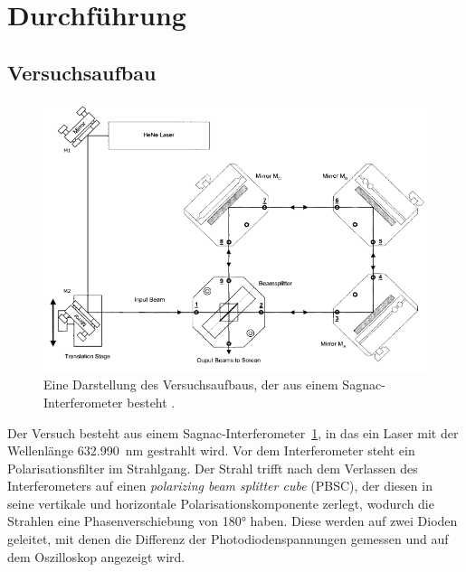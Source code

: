 \section{Durchführung}
\label{sec:Durchführung}
\subsection{Versuchsaufbau}
\begin{figure}[h]
    \centering
    \includegraphics[width = \textwidth]{bild/Aufbau.png}
    \caption{Eine Darstellung des Versuchsaufbaus, der aus einem Sagnac-Interferometer besteht \cite{V64}.}
    \label{fig:Aufbau}
\end{figure}

\noindent
Der Versuch besteht aus einem Sagnac-Interferometer~\ref{fig:Aufbau},
in das ein Laser mit der Wellenlänge \SI{632.990}{\nano\metre} gestrahlt wird. 
Vor dem Interferometer steht ein Polarisationsfilter im Strahlgang.
Der Strahl trifft nach dem Verlassen des Interferometers auf einen 
\textit{polarizing beam splitter cube} (PBSC), 
der diesen in seine vertikale und horizontale Polarisationskomponente zerlegt,
wodurch die Strahlen eine Phasenverschiebung von 180° haben.
Diese werden auf zwei Dioden geleitet,
mit denen die Differenz der Photodiodenspannungen gemessen 
und auf dem Oszilloskop angezeigt wird.

